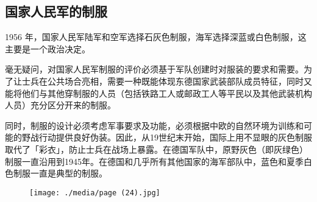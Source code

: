 \subsection{国家人民军的制服}

1956 年，国家人民军陆军和空军选择石灰色制服，海军选择深蓝或白色制服，这主要是一个政治决定。

毫无疑问，对国家人民军制服的评价必须基于军队创建时对服装的要求和需要。为了让士兵在公共场合亮相，需要一种既能体现东德国家武装部队成员特征，同时又能将他们与其他穿制服的人员（包括铁路工人或邮政工人等平民以及其他武装机构人员）充分区分开来的制服。

同时，制服的设计必须考虑军事要求及功能，必须根据中欧的自然环境为训练和可能的野战行动提供良好伪装。因此，从19世纪末开始，国际上用不显眼的灰色制服取代了「彩衣」，防止士兵在战场上暴露。在德国军队中，原野灰色（即灰绿色）制服一直沿用到1945年。在德国和几乎所有其他国家的海军部队中，蓝色和夏季白色制服一直是典型的制服。

\begin{figure}
\texttt{[image: ./media/page (24).jpg]}
\end{figure}


